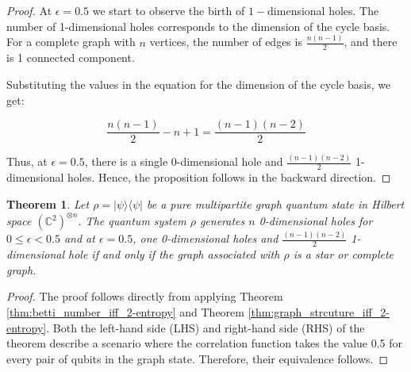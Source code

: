 \documentclass{article}
\newtheorem{theorem}{Theorem}
\newtheorem{corollary}[theorem]{Corollary}
\newcommand{\ket}[1]{|#1\rangle}
\newcommand{\bra}[1]{\langle #1|}
\begin{document}
\begin{proof}
At $\epsilon = 0.5$ we start to observe the birth of $1-$dimensional holes. The number of 1-dimensional holes corresponds to the dimension of the cycle basis. For a complete graph with $ n $ vertices, the number of edges is $ \frac{n(n-1)}{2} $, and there is 1 connected component. 


Substituting the values in the equation for the dimension of the cycle basis, we get:

\begin{equation}
\frac{n(n-1)}{2} - n + 1 = \frac{(n-1)(n-2)}{2}
\end{equation}


Thus, at $ \epsilon = 0.5 $, there is a single 0-dimensional hole and $ \frac{(n-1)(n-2)}{2} $ 1-dimensional holes. Hence, the proposition follows in the backward direction.
\end{proof}


\begin{theorem}
    Let $\rho = \ket{\psi}\bra{\psi}$ be a pure multipartite graph quantum state in Hilbert space $(\mathbb{C}^2)^{\otimes n}$. The quantum system $\rho$ generates $n$ 0-dimensional holes for $0 \leq \epsilon < 0.5$ and at $\epsilon = 0.5$, one 0-dimensional holes and $\frac{(n-1)(n-2)}{2}$ 1-dimensional hole if and only if the graph associated with $\rho$ is a star or complete graph.
\end{theorem}
\begin{proof}
   The proof follows directly from applying Theorem \ref{thm:betti_number_iff_2-entropy} and Theorem \ref{thm:graph_strcuture_iff_2-entropy}. Both the left-hand side (LHS) and right-hand side (RHS) of the theorem describe a scenario where the correlation function takes the value 0.5 for every pair of qubits in the graph state. Therefore, their equivalence follows.
 \end{proof}

 




\end{document}
